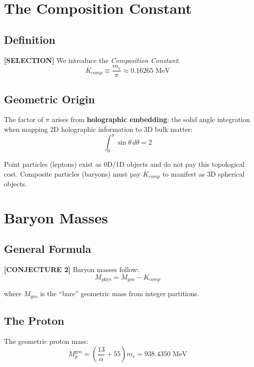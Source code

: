 \documentclass[aps,prd,twocolumn,10pt,groupedaddress,superscriptaddress]{revtex4-2}
\begin{document}
\section{The Composition Constant}

\subsection{Definition}

\textbf{[SELECTION]} We introduce the \textit{Composition Constant}:
\begin{equation}
K_{comp} \equiv \frac{m_e}{\pi} \approx 0.16265 \text{ MeV}
\end{equation}

\subsection{Geometric Origin}

The factor of $\pi$ arises from \textbf{holographic embedding}: the solid angle integration when mapping 2D holographic information to 3D bulk matter:
\begin{equation}
\int_0^\pi \sin\theta\, d\theta = 2
\end{equation}

Point particles (leptons) exist as 0D/1D objects and do not pay this topological cost. Composite particles (baryons) must pay $K_{comp}$ to manifest as 3D spherical objects.

\section{Baryon Masses}

\subsection{General Formula}

\textbf{[CONJECTURE 2]} Baryon masses follow:
\begin{equation}
M_{\text{phys}} = M_{\text{geo}} - K_{comp}
\end{equation}

where $M_{\text{geo}}$ is the ``bare'' geometric mass from integer partitions.

\subsection{The Proton}

The geometric proton mass:
\begin{equation}
M_p^{\text{geo}} = \left(\frac{13}{\alpha} + 55\right) m_e = 938.4350 \text{ MeV}
\end{equation}
\end{document}

